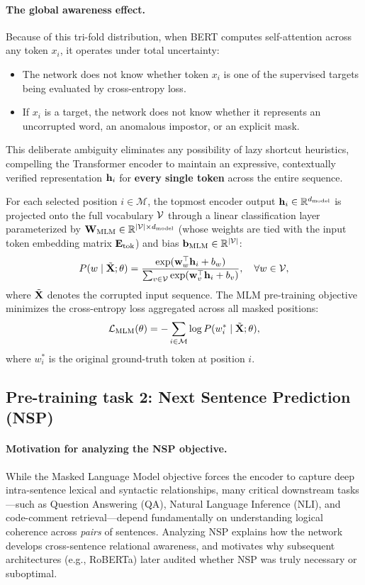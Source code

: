 \documentclass[../../main.tex]{subfiles}
\begin{document}
\paragraph{The global awareness effect.}
Because of this tri-fold distribution, when BERT computes self-attention across any token $x_i$, it operates under total uncertainty:
\begin{itemize}
    \item The network does not know whether token $x_i$ is one of the supervised targets being evaluated by cross-entropy loss.
    \item If $x_i$ is a target, the network does not know whether it represents an uncorrupted word, an anomalous impostor, or an explicit mask.
\end{itemize}
This deliberate ambiguity eliminates any possibility of lazy shortcut heuristics, compelling the Transformer encoder to maintain an expressive, contextually verified representation $\mathbf{h}_i$ for \textbf{every single token} across the entire sequence.

For each selected position $i \in \mathcal{M}$, the topmost encoder output $\mathbf{h}_i \in \mathbb{R}^{d_{\text{model}}}$ is projected onto the full vocabulary $\mathcal{V}$ through a linear classification layer parameterized by $\mathbf{W}_{\text{MLM}} \in \mathbb{R}^{|\mathcal{V}| \times d_{\text{model}}}$ (whose weights are tied with the input token embedding matrix $\mathbf{E}_{\text{tok}}$) and bias $\mathbf{b}_{\text{MLM}} \in \mathbb{R}^{|\mathcal{V}|}$:
\begin{equation}
\label{eq:bert_mlm_prediction_prob}
P(w \mid \tilde{\mathbf{X}}; \theta) = \frac{\exp(\mathbf{w}_w^\top \mathbf{h}_i + b_w)}{\sum_{v \in \mathcal{V}} \exp(\mathbf{w}_v^\top \mathbf{h}_i + b_v)}, \quad \forall w \in \mathcal{V},
\end{equation}
where $\tilde{\mathbf{X}}$ denotes the corrupted input sequence. The MLM pre-training objective minimizes the cross-entropy loss aggregated across all masked positions:
\begin{equation}
\label{eq:bert_mlm_cross_entropy_loss}
\mathcal{L}_{\text{MLM}}(\theta) = -\sum_{i \in \mathcal{M}} \log P(w_i^* \mid \tilde{\mathbf{X}}; \theta),
\end{equation}
where $w_i^*$ is the original ground-truth token at position $i$.

\subsection{Pre-training task 2: Next Sentence Prediction (NSP)}
\label{subsec:bert_nsp}

\paragraph{Motivation for analyzing the NSP objective.}
While the Masked Language Model objective forces the encoder to capture deep intra-sentence lexical and syntactic relationships, many critical downstream tasks---such as Question Answering (QA), Natural Language Inference (NLI), and code-comment retrieval---depend fundamentally on understanding logical coherence across \emph{pairs} of sentences. Analyzing NSP explains how the network develops cross-sentence relational awareness, and motivates why subsequent architectures (e.g., RoBERTa) later audited whether NSP was truly necessary or suboptimal.
\end{document}
